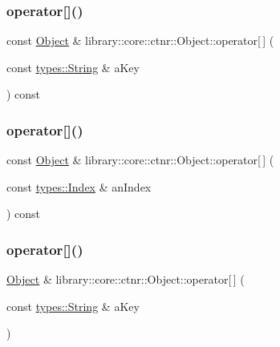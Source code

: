 \subsubsection{\texorpdfstring{operator[]()}{operator[]()}\hspace{0.1cm}{\footnotesize\ttfamily [1/4]}}
{\footnotesize\ttfamily const \hyperlink{classlibrary_1_1core_1_1ctnr_1_1_object}{Object} \& library\+::core\+::ctnr\+::\+Object\+::operator\mbox{[}$\,$\mbox{]} (\begin{DoxyParamCaption}\item[{const \hyperlink{classlibrary_1_1core_1_1types_1_1_string}{types\+::\+String} \&}]{a\+Key }\end{DoxyParamCaption}) const}

\mbox{\label{classlibrary_1_1core_1_1ctnr_1_1_object_a33f9e2d26a3b987cd3000364c4f715c0}} 
\subsubsection{\texorpdfstring{operator[]()}{operator[]()}\hspace{0.1cm}{\footnotesize\ttfamily [2/4]}}
{\footnotesize\ttfamily const \hyperlink{classlibrary_1_1core_1_1ctnr_1_1_object}{Object} \& library\+::core\+::ctnr\+::\+Object\+::operator\mbox{[}$\,$\mbox{]} (\begin{DoxyParamCaption}\item[{const \hyperlink{namespacelibrary_1_1core_1_1types_ad87eeb821d7067ec94e06ed1980d6350}{types\+::\+Index} \&}]{an\+Index }\end{DoxyParamCaption}) const}

\mbox{\label{classlibrary_1_1core_1_1ctnr_1_1_object_ac6f1e43e985c9e31dbae1b1e87d72dca}} 
\subsubsection{\texorpdfstring{operator[]()}{operator[]()}\hspace{0.1cm}{\footnotesize\ttfamily [3/4]}}
{\footnotesize\ttfamily \hyperlink{classlibrary_1_1core_1_1ctnr_1_1_object}{Object} \& library\+::core\+::ctnr\+::\+Object\+::operator\mbox{[}$\,$\mbox{]} (\begin{DoxyParamCaption}\item[{const \hyperlink{classlibrary_1_1core_1_1types_1_1_string}{types\+::\+String} \&}]{a\+Key }\end{DoxyParamCaption})}

